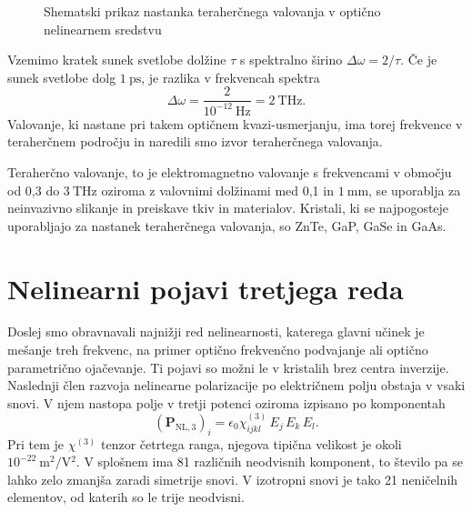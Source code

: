 \begin{figure}[h]
\centering
\def\svgwidth{110truemm} 

\caption{Shematski prikaz nastanka teraherčnega valovanja v optično nelinearnem sredstvu}
\label{fig:THz}
\end{figure}

Vzemimo kratek sunek svetlobe dolžine $\tau$ s spektralno širino
$\Delta \omega = 2/\tau$.
Če je sunek svetlobe dolg $1~\si{\pico\second}$, je razlika v frekvencah 
spektra 
\begin{equation}
\Delta \omega = \frac{2}{10^{-12}~\si{\hertz}} = 2~\si{\tera\hertz}.
\end{equation}
Valovanje, ki nastane pri takem optičnem kvazi-usmerjanju, ima torej frekvence v teraherčnem
področju in naredili smo izvor teraherčnega valovanja. 

Teraherčno valovanje, to je 
elektromagnetno valovanje s frekvencami v območju od 0,3 do $3~\si{\tera\hertz}$
oziroma z valovnimi dolžinami med 0,1 in $1~\si{\milli\metre}$, 
se uporablja za neinvazivno slikanje in preiskave tkiv in materialov. Kristali, ki 
se najpogosteje uporabljajo za nastanek teraherčnega valovanja, so ZnTe, 
GaP, GaSe in GaAs.  

\section{Nelinearni pojavi tretjega reda}
Doslej smo obravnavali najnižji red nelinearnosti, katerega glavni
učinek je mešanje treh frekvenc, na primer optično frekvenčno podvajanje ali
optično parametrično ojačevanje. Ti pojavi so možni le v kristalih brez centra
inverzije. Naslednji člen razvoja nelinearne polarizacije po električnem
polju obstaja v vsaki snovi. V njem nastopa polje v tretji potenci
oziroma izpisano po komponentah
\begin{equation}
\left(\mathbf{P}_{\mathrm{NL,3}}\right)_i= \epsilon_{0}\chi^{(3)}_{ijkl} \,E_j \,E_k\, E_l.
\end{equation}
Pri tem je $\chi^{(3)}$ tenzor četrtega ranga, njegova tipična velikost je okoli 
$10^{-22}~\si{\metre^2/\volt^2}$. V splošnem ima 81 različnih neodvisnih komponent, to
število pa se lahko zelo zmanjša zaradi simetrije snovi. V izotropni snovi je tako
21 neničelnih elementov, od katerih so le trije neodvisni. 

